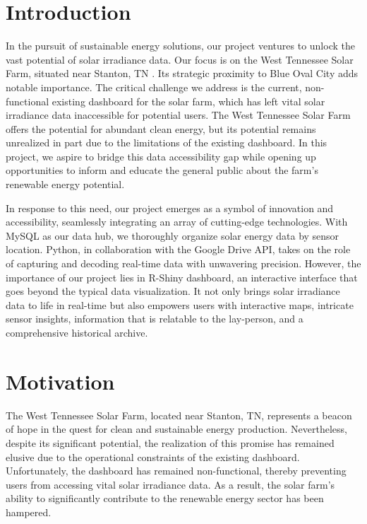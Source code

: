 \documentclass{sigchi}
\begin{document}
\section{Introduction}

In the pursuit of sustainable energy solutions, our project ventures to unlock the vast potential of solar irradiance data. Our focus is on the West Tennessee Solar Farm, situated near Stanton, TN \cite{9_WTSF}. Its strategic proximity to Blue Oval City adds notable importance. The critical challenge we address is the current, non-functional existing dashboard for the solar farm, which has left vital solar irradiance data inaccessible for potential users. The West Tennessee Solar Farm offers the potential for abundant clean energy, but its potential remains unrealized in part due to the limitations of the existing dashboard. In this project, we aspire to bridge this data accessibility gap while opening up opportunities to inform and educate the general public about the farm's renewable energy potential.

In response to this need, our project emerges as a symbol of innovation and accessibility, seamlessly integrating an array of cutting-edge technologies. With MySQL as our data hub, we thoroughly organize solar energy data by sensor location. Python, in collaboration with the Google Drive API, takes on the role of capturing and decoding real-time data with unwavering precision. However, the importance of our project lies in R-Shiny dashboard, an interactive interface that goes beyond the typical data visualization. It not only brings solar irradiance data to life in real-time but also empowers users with interactive maps, intricate sensor insights, information that is relatable to the lay-person, and a comprehensive historical archive.

\section{Motivation}

The West Tennessee Solar Farm, located near Stanton, TN, represents a beacon of hope in the quest for clean and sustainable energy production. Nevertheless, despite its significant potential, the realization of this promise has remained elusive due to the operational constraints of the existing dashboard. Unfortunately, the dashboard has remained non-functional, thereby preventing users from accessing vital solar irradiance data. As a result, the solar farm's ability to significantly contribute to the renewable energy sector has been hampered.
\end{document}
